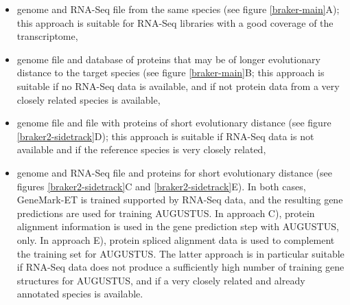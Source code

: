 \documentclass[a4paper,10pt]{report}
\begin{document}
\begin{itemize}
 \item genome and RNA-Seq file from the same species (see figure \ref{braker-main}A); this approach is suitable for RNA-Seq libraries with a good coverage of the transcriptome,
 \item genome file and database of proteins that may be of longer evolutionary distance to the target species (see figure \ref{braker-main}B; this approach is suitable if no RNA-Seq data is available, and if not protein data from a very closely related species is available,
 \item genome file and file with proteins of short evolutionary distance (see figure \ref{braker2-sidetrack}D); this approach is suitable if RNA-Seq data is not available and if the reference species is very closely related,
 \item genome and RNA-Seq file and proteins for short evolutionary distance (see figures \ref{braker2-sidetrack}C and \ref{braker2-sidetrack}E). In both cases, GeneMark-ET is trained supported by RNA-Seq data, and the resulting gene predictions are used for training AUGUSTUS. In approach C), protein alignment information is used in the gene prediction step with AUGUSTUS, only. In approach E), protein spliced alignment data is used to complement the training set for AUGUSTUS. The latter approach is in particular suitable if RNA-Seq data does not produce a sufficiently high number of training gene structures for AUGUSTUS, and if a very closely related and already annotated species is available.
\end{itemize}
\end{document}
